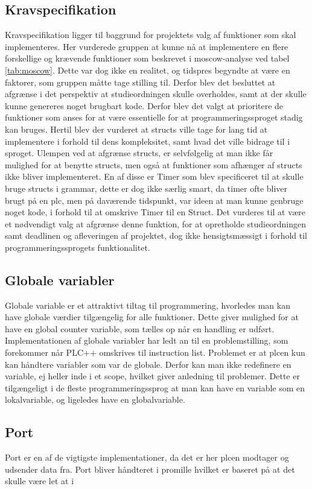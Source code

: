 \subsection*{Kravspecifikation}
Kravspecifikation ligger til baggrund for projektets valg af funktioner som skal implementeres.
Her vurderede gruppen at kunne nå at implementere en flere forskellige og krævende funktioner som beskrevet i \gls{moscow}-analyse ved tabel \ref{tab:moscow}.
Dette var dog ikke en realitet, og tidspres begyndte at være en faktorer, som gruppen måtte tage stilling til.
Derfor blev det besluttet at afgrænse i det perspektiv at studieordningen skulle overholdes, samt at der skulle kunne genereres noget brugbart kode.
Derfor blev det valgt at prioritere de funktioner som anses for at være essentielle for at programmeringssproget stadig kan bruges. Hertil blev der vurderet at structs ville tage for lang tid at implementere i forhold til dens kompleksitet, samt hvad det ville bidrage til i sproget.
Ulempen ved at afgrænse structs, er selvfølgelig at man ikke får mulighed for at benytte structs, men også at funktioner som afhænger af structs ikke bliver implementeret.
En af disse er Timer som blev specificeret til at skulle bruge structs i grammar, dette er dog ikke særlig smart, da timer ofte bliver brugt på en \gls{plc}, men på daværende tidspunkt, var ideen at man kunne genbruge noget kode, i forhold til at omskrive Timer til en Struct.
Det vurderes til at være et nødvendigt valg at afgrænse denne funktion, for at opretholde studieordningen samt deadlinen og afleveringen af projektet, dog ikke hensigtsmæssigt i forhold til programmeringssprogets funktionalitet.

\subsection*{Globale variabler}
Globale variable er et attraktivt tiltag til programmering, hvorledes man kan have globale værdier tilgængelig for alle funktioner.
Dette giver mulighed for at have en global counter variable, som tælles op når en handling er udført.
Implementationen af globale variabler har ledt an til en problemstilling, som forekommer når PLC++ omskrives til instruction list. Problemet er at \gls{plc}en kun kan håndtere variabler som var de globale.
Derfor kan man ikke redefinere en variable, ej heller inde i et scope, hvilket giver anledning til problemer.
Dette er tilgængeligt i de fleste programmeringssprog at man kan have en variable som en lokalvariable, og ligeledes have en globalvariable.


\subsection*{Port}
Port er en af de vigtigste implementationer, da det er her \gls{plc}en modtager og udsender data fra.
Port bliver håndteret i promille hvilket er baseret på at det skulle være let at i






